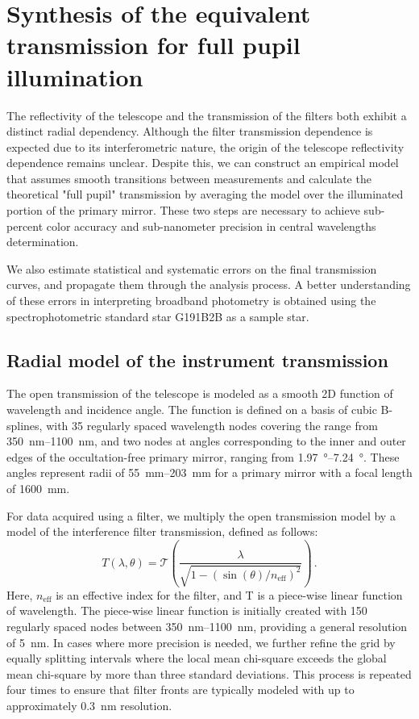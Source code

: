 \section{Synthesis of the equivalent transmission for full pupil illumination}
\label{sec:pupil_stitching}

The reflectivity of the telescope and the transmission of the filters
both exhibit a distinct radial dependency. Although the filter
transmission dependence is expected due to its interferometric nature,
the origin of the telescope reflectivity dependence remains
unclear. Despite this, we can construct an empirical model that
assumes smooth transitions between measurements and calculate the
theoretical "full pupil" transmission by averaging the model over the
illuminated portion of the primary mirror. These two steps are
necessary to achieve sub-percent color accuracy and sub-nanometer
precision in central wavelengths determination.

We also estimate statistical and systematic errors on the final
transmission curves, and propagate them through the analysis process. A
better understanding of these errors in interpreting broadband
photometry is obtained using the spectrophotometric standard star
G191B2B as a sample star.


\subsection{Radial model of the instrument transmission}
\label{sec:model}

The open transmission of the telescope is modeled as a smooth 2D
function of wavelength and incidence angle. The function is defined on
a basis of cubic B-splines, with \num{35} regularly spaced wavelength
nodes covering the range from \SIrange{350}{1100}{nm}, and two nodes
at angles corresponding to the inner and outer edges of the
occultation-free primary mirror, ranging from \SIrange{1.97}{7.24}
{\degree}. These angles represent radii of \SIrange{55}{203}{mm} for a
primary mirror with a focal length of \SI{1600}{mm}.

For data acquired using a filter, we multiply the open transmission
model by a model of the interference filter transmission, defined as
follows:
\begin{equation}
  \label{eq:filtertransmission}
T(\lambda, \theta) = \mathcal T\left(\frac{\lambda}{\sqrt{1 -
    (\sin(\theta) / n_\text{eff})^2}}\right)\,.
\end{equation}
Here, $n_\text{eff}$ is an effective index for the filter,
and T is a piece-wise linear function of wavelength. The piece-wise
linear function is initially created with \num{150} regularly spaced
nodes between \SIrange{350}{1100}{nm}, providing a general resolution
of \SI{5}{nm}. In cases where more precision is needed, we further
refine the grid by equally splitting intervals where the local mean
chi-square exceeds the global mean chi-square by more than three
standard deviations. This process is repeated four times to ensure
that filter fronts are typically modeled with up to approximately
\SI{0.3}{nm} resolution.


